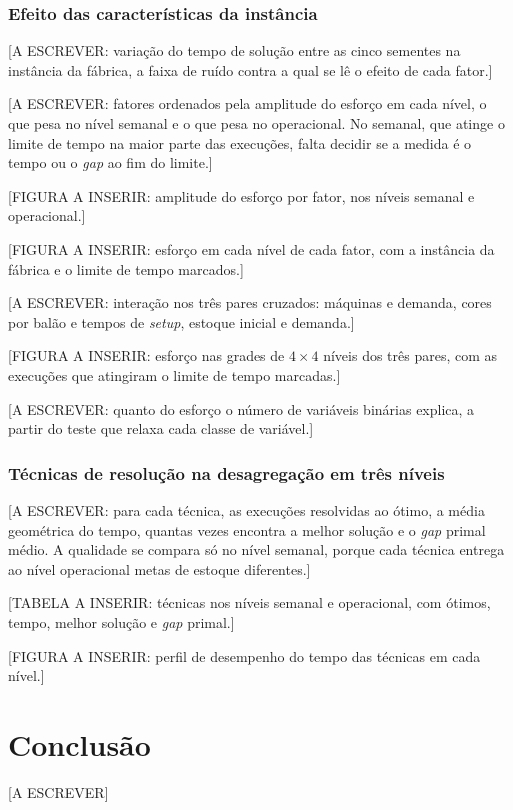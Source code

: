 \documentclass[
    12pt,
    openright,
    oneside,
    a4paper,
    fleqn,
    chapter=TITLE,
    section=TITLE,
    english,
    brazil
]{abntex2}
\begin{document}
\subsection{Efeito das características da instância}
\label{sec:resultado_fatores}

[A ESCREVER: variação do tempo de solução entre as cinco sementes na instância da fábrica, a faixa de ruído contra a qual se lê o efeito de cada fator.]

[A ESCREVER: fatores ordenados pela amplitude do esforço em cada nível, o que pesa no nível semanal e o que pesa no operacional. No semanal, que atinge o limite de tempo na maior parte das execuções, falta decidir se a medida é o tempo ou o \textit{gap} ao fim do limite.]

[FIGURA A INSERIR: amplitude do esforço por fator, nos níveis semanal e operacional.]

[FIGURA A INSERIR: esforço em cada nível de cada fator, com a instância da fábrica e o limite de tempo marcados.]

[A ESCREVER: interação nos três pares cruzados: máquinas e demanda, cores por balão e tempos de \textit{setup}, estoque inicial e demanda.]

[FIGURA A INSERIR: esforço nas grades de $4 \times 4$ níveis dos três pares, com as execuções que atingiram o limite de tempo marcadas.]

[A ESCREVER: quanto do esforço o número de variáveis binárias explica, a partir do teste que relaxa cada classe de variável.]

\subsection{Técnicas de resolução na desagregação em três níveis}
\label{sec:resultado_tecnicas}

[A ESCREVER: para cada técnica, as execuções resolvidas ao ótimo, a média geométrica do tempo, quantas vezes encontra a melhor solução e o \textit{gap} primal médio. A qualidade se compara só no nível semanal, porque cada técnica entrega ao nível operacional metas de estoque diferentes.]

[TABELA A INSERIR: técnicas nos níveis semanal e operacional, com ótimos, tempo, melhor solução e \textit{gap} primal.]

[FIGURA A INSERIR: perfil de desempenho do tempo das técnicas em cada nível.]

\chapter{Conclusão}
\label{sec:conclusao}

[A ESCREVER]


\postextual



\begin{apendicesenv}
\end{apendicesenv}
\end{document}
